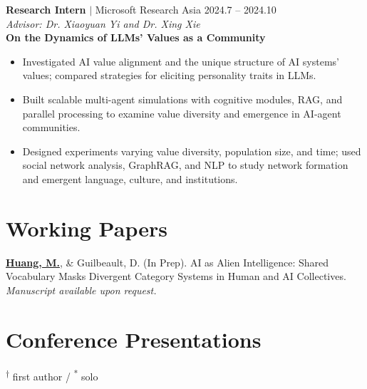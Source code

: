 \documentclass[11pt,letterpaper]{article}
\newcommand{\myname}[1]{\textbf{\uline{#1}}}
\newcommand{\project}[1]{\textbf{\textcolor{black!80}{#1}}}
\newcommand{\advisor}[1]{\textit{Advisor: #1}}
\begin{document}
\vspace{0.5em}
\noindent\begin{minipage}{\textwidth}
\noindent\textbf{Research Intern} $|$ Microsoft Research Asia \hfill 2024.7 -- 2024.10\\
\noindent\advisor{Dr. Xiaoyuan Yi and Dr. Xing Xie}\\
\noindent\project{On the Dynamics of LLMs' Values as a Community}
\begin{itemize}
    \item Investigated AI value alignment and the unique structure of AI systems' values; compared strategies for eliciting personality traits in LLMs.
    \item Built scalable multi-agent simulations with cognitive modules, RAG, and parallel processing to examine value diversity and emergence in AI-agent communities.
    \item Designed experiments varying value diversity, population size, and time; used social network analysis, GraphRAG, and NLP to study network formation and emergent language, culture, and institutions.
\end{itemize}
\end{minipage}

\section*{Working Papers}

\begin{enumerate}[label={[\arabic*]}]
    \item \myname{Huang, M.}, \& Guilbeault, D. (In Prep). AI as Alien Intelligence: Shared Vocabulary Masks Divergent Category Systems in Human and AI Collectives. \textit{Manuscript available upon request.}
\end{enumerate}

\section*{Conference Presentations}

\noindent\textsuperscript{$\dagger$} first author / \textsuperscript{*} solo
\end{document}
